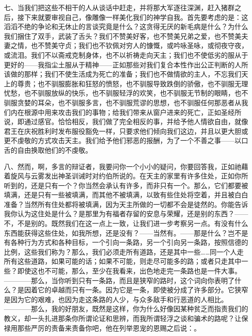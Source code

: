 七、当我们把这些不相干的人从谈话中赶走，并将那大军逐往深渊，赶入猪群之后，接下来就要审视自己，像雕像一样美化我们的神学自我。首先要考虑的是：这滔滔不绝的争论和无休止的言谈究竟是什么？这贪得无厌的新毛病是什么？为什么我们捆住了双手，武装了舌头？我们不赞美好客，也不赞美兄弟之爱，也不赞美夫妻之情，也不赞美守贞；我们也不钦佩对穷人的慷慨，或吟咏圣咏，或彻夜守夜，或流泪。我们不以斋戒克制身体，也不以祈祷走向天主；我们也不使低劣的服从于更好的——我指尘土服从于精神——正如那些对我们复合本性作出公正判断的人所该做的那样；我们不使生活成为死亡的准备；我们也不做情欲的主人，不忘我们天上的尊贵；也不驯服膨胀和狂怒的愤怒，也不驯服导致跌倒的骄傲，也不驯服无理忧愁，也不驯服放纵的快乐，也不驯服轻浮的欢笑，也不驯服无节制的眼睛，也不驯服贪婪的耳朵，也不驯服多言，也不驯服荒谬的思想，也不驯服任何那恶者从我们内在根源中用来攻击我们的事物；给我们带来从窗户进来的死亡，正如圣经所说，即通过感官。恰恰相反，我们做了完全相反的事，并给予他人情欲自由，就像君王在庆祝胜利时发布服役豁免一样，只要求他们倾向我们这边，并且以更大胆或更不虔敬的方式攻击天主。我们给予他们邪恶的报酬，为了一个不善之事——以口舌的自由换取他们的不虔敬。\par

八、然而，啊，多言的辩证者，我要问你一个小小的疑问，你要回答我，正如祂藉着旋风与云雾发出神圣训诫时对约伯所说的。在天主的家里有许多住处，正如你所听到的，还是只有一个？你当然会承认有许多，而非只有一个。那么，它们都要被填满，还是只有一些被填满，而其他不被填满，以致有些住处将空着，并且被白白准备？当然所有住处都将被填满，因为天主所做的一切都不会是徒然的。你能告诉我你认为这住处是什么？是那里为有福者存留的安息与荣耀，还是别的东西？——不，不是别的。既然我们在这一点上一致，让我们进一步考察另一点。有没有什么东西能获得这些住处，如我所想，还是没有？——当然有。——那是什么？岂不是有各种行为方式和各种目标，一个引向一条路，另一个引向另一条路，按照信德的比例，这些我们称为？那么，我们必须走所有道路，还是其中一些……同一个人走所有这些道路，如果可能的话；如果不可能，则走尽可能多的路；或者只走其中一些？即使这也不可能，那么，至少在我看来，出色地走完一条路也是一件大事。————那么，当你听到只有一条路，而且是狭窄的路时，这个词向你表明了什么？是因着它的卓越而只有一条。因为它是一条，即使被分成了许多部分。它狭窄是因为它的艰难，也因为走这条路的人少，与众多敌手和行恶道的人相比。————那么，我的好朋友，既然是这样，你为什么好像因某种贫乏而指责我们的教义，却一头扎进那条你所谓论证和思辨，而我所谓轻浮之谈和骗术的路呢？让保禄用那些严厉的责备来责备你吧，他在列举恩宠的恩赐之后说：。\par

